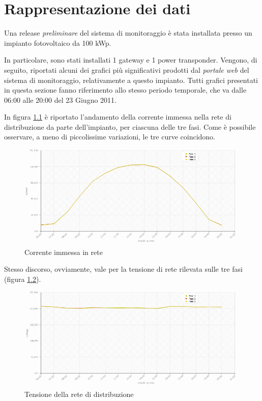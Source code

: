 \chapter{Rappresentazione dei dati}
\label{sec:datapresentation}
%
Una release \emph{preliminare} del sistema di monitoraggio \`e stata installata
presso un impianto fotovoltaico da 100 kWp.
%

%
In particolare, sono stati installati 1 gateway e 1 power transponder.
%
Vengono, di seguito, riportati alcuni dei grafici pi\`u significativi prodotti dal 
\emph{portale web} del sistema di monitoraggio, relativamente a questo impianto.
%
Tutti grafici presentati in questa sezione fanno riferimento allo stesso periodo 
temporale, che va dalle 06:00 alle 20:00 del 23 Giugno 2011.
%

%
In figura \ref{fig:current-power-tr} \`e riportato l'andamento della corrente immessa nella
rete di distribuzione da parte dell'impianto, per ciascuna delle tre fasi. Come \`e possibile
osservare, a meno di piccolissime variazioni, le tre curve coincidono.
%
\begin{figure}[!h]
\centering
\includegraphics[width=400pt]{img/portale/current-power-transponder.png}
\caption{Corrente immessa in rete}
\label{fig:current-power-tr}
\end{figure}
%
Stesso discorso, ovviamente, vale per la tensione di rete rilevata sulle tre fasi (figura \ref{fig:voltage-power-tr}).
%

%
\begin{figure}[!h]
\centering
\includegraphics[width=400pt]{img/portale/voltage-power-transponder.png}
\caption{Tensione della rete di distribuzione}
\label{fig:voltage-power-tr}
\end{figure}
%

